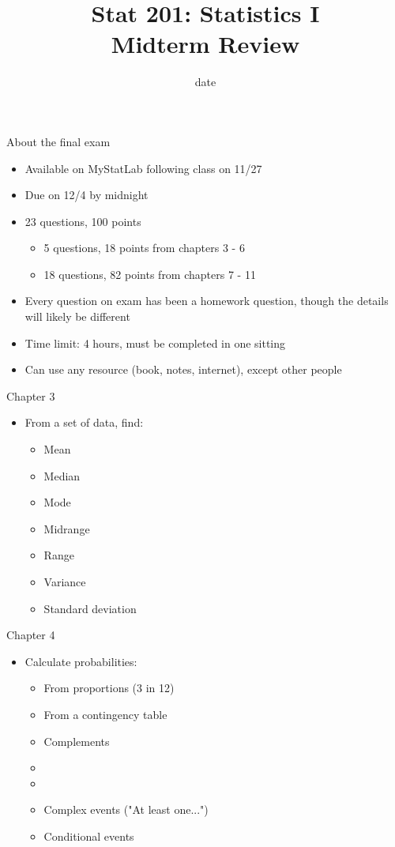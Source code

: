 \documentclass[xcolor=table]{beamer}
\title[Midterm Review]{Stat 201: Statistics I\\Midterm Review}
\author[M. Shyne]{}
\institute[Metro State]{\texttt{[image: ../images/metro\_logo]}}
\date{date}
\begin{document}
\frame{\titlepage}

\begin{frame}{About the final exam}
\begin{block}{}
\large
\begin{itemize}
\item Available on MyStatLab following class on 11/27
\item Due on 12/4 by midnight
\item 23 questions, 100 points
\begin{itemize}
\item 5 questions, 18 points from chapters 3 - 6
\item 18 questions, 82 points from chapters 7 - 11
\end{itemize}
\item Every question on exam has been a homework question, though the details will likely be different
\item Time limit: 4 hours, must be completed in one sitting
\item Can use any resource (book, notes, internet), except other people
\end{itemize}
\end{block}
\end{frame}


\begin{frame}{Chapter 3}
\begin{block}{}
\large
\begin{itemize}
\item From a set of data, find:
\begin{itemize}
\item Mean
\item Median
\item Mode
\item Midrange
\item Range
\item Variance
\item Standard deviation
\end{itemize}
\end{itemize}
\end{block}
\end{frame}

\begin{frame}{Chapter 4}
\begin{block}{}
\large
\begin{itemize}
\item Calculate probabilities:
\begin{itemize}
\item From proportions (3 in 12)
\item From a contingency table
\item Complements
\item {}
\item {}
\item Complex events ("At least one...")
\item Conditional events
\end{itemize}
\end{itemize}
\end{block}
\end{frame}
\end{document}
